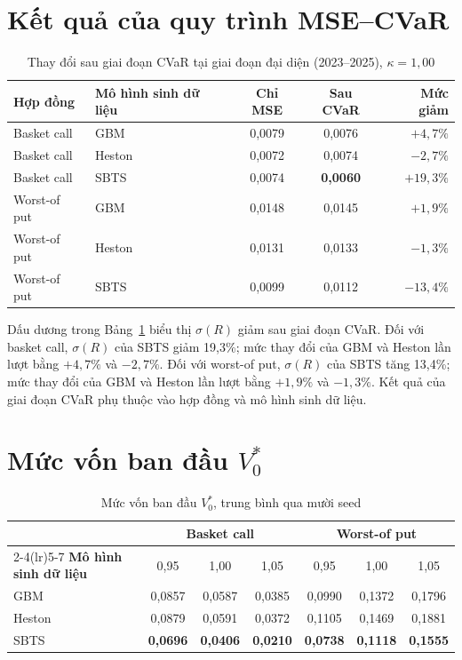 \section{Kết quả của quy trình MSE--CVaR}
\label{sec:c4-curriculum}

\begin{table}[H]
\centering
\small
\caption{Thay đổi sau giai đoạn CVaR tại giai đoạn đại diện (2023--2025), $\kappa=1{,}00$}
\label{tab:c4-curriculum}
\begin{tabular}{@{}llccr@{}}
\toprule
\textbf{Hợp đồng} & \textbf{Mô hình sinh dữ liệu} & \textbf{Chỉ MSE} &
\textbf{Sau CVaR} & \textbf{Mức giảm}\\
\midrule
Basket call & GBM & 0,0079 & 0,0076 & $+4,7\%$\\
Basket call & Heston & 0,0072 & 0,0074 & $-2,7\%$\\
Basket call & SBTS & 0,0074 & \textbf{0,0060} & \textbf{$+19,3\%$}\\
\midrule
Worst-of put & GBM & 0,0148 & 0,0145 & $+1,9\%$\\
Worst-of put & Heston & 0,0131 & 0,0133 & $-1,3\%$\\
Worst-of put & SBTS & 0,0099 & 0,0112 & $-13,4\%$\\
\bottomrule
\end{tabular}
\end{table}

Dấu dương trong Bảng~\ref{tab:c4-curriculum} biểu thị $\sigma(R)$ giảm sau
giai đoạn CVaR. Đối với basket call, $\sigma(R)$ của SBTS giảm 19,3\%; mức thay
đổi của GBM và Heston lần lượt bằng $+4,7\%$ và $-2,7\%$. Đối với worst-of
put, $\sigma(R)$ của SBTS tăng 13,4\%; mức thay đổi của GBM và Heston lần lượt
bằng $+1,9\%$ và $-1,3\%$. Kết quả của giai đoạn CVaR phụ thuộc vào hợp đồng
và mô hình sinh dữ liệu.

\section{Mức vốn ban đầu $V_0^{*}$}
\label{sec:c4-v0}

\begin{table}[H]
\centering
\small
\setlength{\tabcolsep}{4pt}
\caption{Mức vốn ban đầu $V_0^{*}$, trung bình qua mười seed}
\label{tab:c4-v0}
\begin{tabular}{@{}lcccccc@{}}
\toprule
& \multicolumn{3}{c}{\textbf{Basket call}}
& \multicolumn{3}{c}{\textbf{Worst-of put}}\\
\cmidrule(lr){2-4}\cmidrule(lr){5-7}
\textbf{Mô hình sinh dữ liệu} & 0,95 & 1,00 & 1,05 & 0,95 & 1,00 & 1,05\\
\midrule
GBM & 0,0857 & 0,0587 & 0,0385 & 0,0990 & 0,1372 & 0,1796\\
Heston & 0,0879 & 0,0591 & 0,0372 & 0,1105 & 0,1469 & 0,1881\\
SBTS & \textbf{0,0696} & \textbf{0,0406} & \textbf{0,0210}
& \textbf{0,0738} & \textbf{0,1118} & \textbf{0,1555}\\
\bottomrule
\end{tabular}
\end{table}

